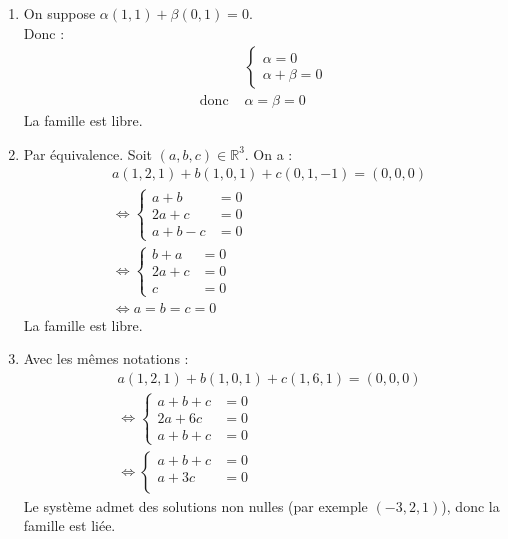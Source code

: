 \documentclass[../main.tex]{subfiles}
\begin{document}
\begin{enumerate}
    \item On suppose $\alpha(1, 1) + \beta(0, 1) = 0$. \\
    Donc : 
    \begin{align*}
        &\begin{cases}
            \alpha = 0 \\
            \alpha + \beta = 0
        \end{cases} \\
        \text{donc } &\alpha = \beta = 0
    \end{align*}
    La famille est libre. 

    \item Par équivalence. Soit $(a, b, c) \in \mathbb{R}^3$. On a :\\
    \begin{align*}
        &a(1, 2, 1) + b(1, 0, 1) + c(0, 1, -1) = (0, 0, 0) \\
        &\Leftrightarrow \begin{cases}
            a + b &= 0 \\
            2a + c &= 0 \\
            a + b - c &= 0
        \end{cases} \\
        &\Leftrightarrow \begin{cases}
            b + a &= 0 \\
            2a + c &= 0 \\
            c &= 0
        \end{cases} \\
        &\Leftrightarrow a = b = c = 0
    \end{align*}
    La famille est libre. 

    \item Avec les mêmes notations : 
    \begin{align*}
        &a(1, 2, 1) + b(1, 0, 1) + c(1, 6, 1) = (0, 0, 0) \\
        &\Leftrightarrow \begin{cases}
            a + b + c &= 0 \\
            2a + 6c &= 0 \\
            a + b + c &= 0
        \end{cases} \\
        &\Leftrightarrow \begin{cases}
            a + b + c &= 0 \\
            a + 3c &= 0 \\
        \end{cases}
    \end{align*}
    Le système admet des solutions non nulles (par exemple $(-3, 2, 1)$), donc la famille est liée. 
\end{enumerate}
\end{document}
